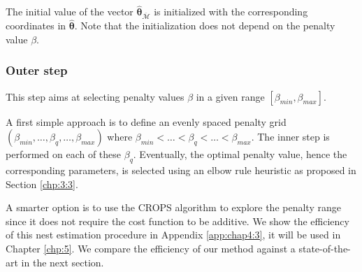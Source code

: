 The initial value of the vector $\widehat{\bm\theta}_{\overline{\mathcal{M}}}$ is initialized with the corresponding coordinates in $\widehat{\bm\theta}$. Note that the initialization does not depend on the penalty value $\beta$. 


\subsubsection{Outer step}\label{chp:4:3:2:2}

This step aims at selecting penalty values $\beta$ in a given range $[\beta_{min},\beta_{max}]$.

A first simple approach is to define an evenly spaced penalty grid $(\beta_{min},\dots,\beta_q,\dots,\beta_{max})$ where $\beta_{min}<\dots<\beta_{q}<\dots<\beta_{max}$. The inner step is performed on each of these $\beta_{q}$. Eventually, the optimal penalty value, hence the corresponding parameters, is selected using an elbow rule heuristic as proposed in Section \ref{chp:3:3}.

A smarter option is to use the CROPS algorithm to explore the penalty range since it does not require the cost function to be additive.  
\newline
\newline
We show the efficiency of this nest estimation procedure in Appendix \ref{app:chap4:3}, it will be used in Chapter \ref{chp:5}. We compare the efficiency of our method against a state-of-the-art in the next section.


